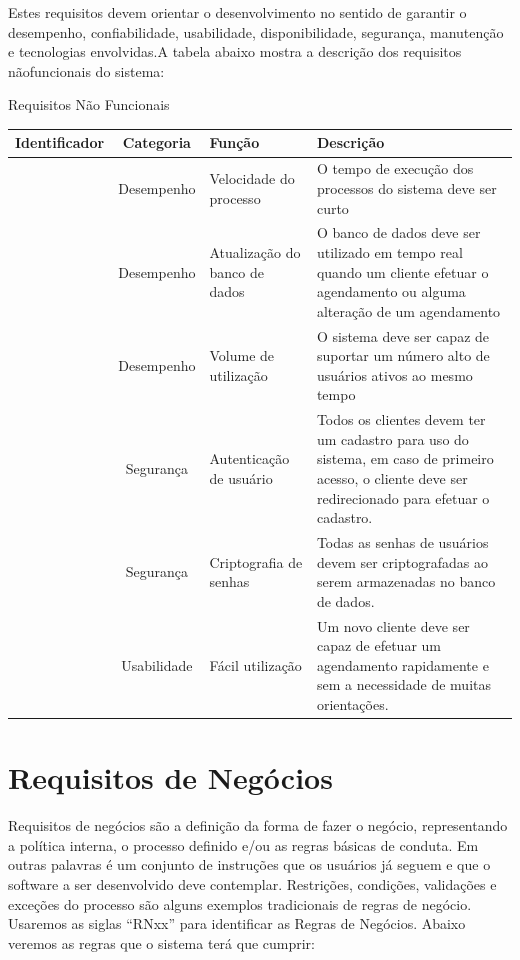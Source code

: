\documentclass[
	12pt,				%
	openright,			%
	twoside,			%
	a4paper,			%
	english,			%
	french,				%
	spanish,			%
	brazil				%
	]{abntex2}
\begin{document}
Estes requisitos devem orientar o desenvolvimento no sentido de garantir o
desempenho, confiabilidade, usabilidade, disponibilidade, segurança, manutenção
e tecnologias envolvidas.A tabela abaixo mostra a descrição dos requisitos nãofuncionais do sistema:

\begin{quadro}[htb]
	\centering
	\caption{\label{quadro_RNF}Requisitos Não Funcionais}
	\begin{tabular}{|c|c|>{\centering\arraybackslash}p{4cm}|>{\centering\arraybackslash}p{6cm}|}
		\hline
		\textbf{Identificador} & \textbf{Categoria} & \textbf{Função} & \textbf{Descrição}\\ \hline
		[RNF01] & Desempenho  & Velocidade do processo        & O tempo de execução dos processos do sistema deve ser curto \\ \hline
		[RNF02] & Desempenho  & Atualização do banco de dados & O banco de dados deve ser utilizado em tempo real quando um cliente efetuar o agendamento ou alguma alteração de um agendamento \\ \hline
		[RNF03] & Desempenho  & Volume de utilização          & O sistema deve ser capaz de suportar um número alto de usuários ativos ao mesmo tempo \\ \hline
		[RNF04] & Segurança   & Autenticação de usuário       & Todos os clientes devem ter um cadastro para uso do sistema, em caso de primeiro acesso, o cliente deve ser redirecionado para efetuar o cadastro. \\ \hline
		[RNF05] & Segurança   & Criptografia de senhas        & Todas as senhas de usuários devem ser criptografadas ao serem armazenadas no banco de dados. \\ \hline
		[RNF06] & Usabilidade & Fácil utilização              & Um novo cliente deve ser capaz de efetuar um agendamento rapidamente e sem a necessidade de muitas orientações. \\ \hline
	\end{tabular}
\end{quadro}

\section{Requisitos de Negócios}
Requisitos de negócios são a definição da forma de fazer o negócio,
representando a política interna, o processo definido e/ou as regras básicas de
conduta. Em outras palavras é um conjunto de instruções que os usuários já
seguem e que o software a ser desenvolvido deve contemplar. Restrições,
condições, validações e exceções do processo são alguns exemplos tradicionais de
regras de negócio. Usaremos as siglas “RNxx” para identificar as Regras de
Negócios. Abaixo veremos as regras que o sistema terá que cumprir:
\end{document}
